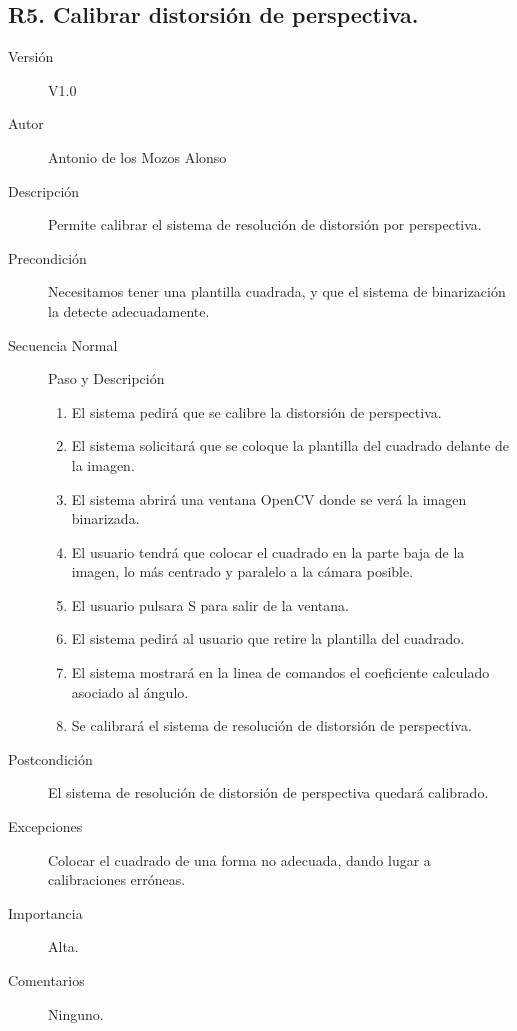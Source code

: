 \subsection{R5. Calibrar distorsión de perspectiva.}
\begin{description}
	\item [Versión] V1.0
	\item [Autor] Antonio de los Mozos Alonso
	\item [Descripción] Permite calibrar el sistema de resolución de distorsión por perspectiva.
	\item [Precondición] Necesitamos tener una plantilla cuadrada, y que el sistema de binarización la detecte adecuadamente.
	\item [Secuencia Normal] Paso y Descripción
		\begin{enumerate}
			\item El sistema pedirá que se calibre la distorsión de perspectiva.
			\item El sistema solicitará que se coloque la plantilla del cuadrado delante de la imagen.
			\item El sistema abrirá una ventana OpenCV donde se verá la imagen binarizada.
			\item El usuario tendrá que colocar el cuadrado en la parte baja de la imagen, lo más centrado y paralelo a la cámara posible.
			\item El usuario pulsara S para salir de la ventana.
			\item El sistema pedirá al usuario que retire la plantilla del cuadrado.
			\item El sistema mostrará en la linea de comandos el coeficiente calculado asociado al ángulo.
			
			\item Se calibrará el sistema de resolución de distorsión de perspectiva.
		\end{enumerate}
	\item [Postcondición] El sistema de resolución de distorsión de perspectiva quedará calibrado.
	\item [Excepciones] Colocar el cuadrado de una forma no adecuada, dando lugar a calibraciones erróneas.
	\item [Importancia] Alta.
	\item [Comentarios] Ninguno.
\end{description}

